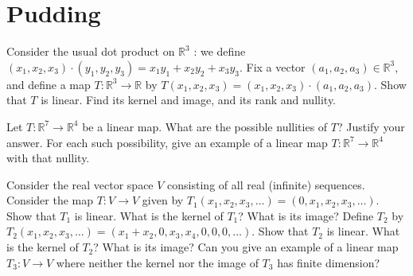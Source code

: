 \documentclass[answers]{exam}
\begin{document}
\section*{Pudding}
\begin{questions}

\question%
Consider the usual dot product on $\mathbb{R}^{3}$ : we define $(x_{1}, x_{2}, x_{3}) \cdot(y_{1}, y_{2}, y_{3})=x_{1} y_{1}+x_{2} y_{2}+x_{3} y_{3}$. Fix a vector $(a_{1}, a_{2}, a_{3}) \in \mathbb{R}^{3}$, and define a map $T: \mathbb{R}^{3} \to \mathbb{R}$ by $T(x_{1}, x_{2}, x_{3})=(x_{1}, x_{2}, x_{3}) \cdot(a_{1}, a_{2}, a_{3})$. Show that $T$ is linear. Find its kernel and image, and its rank and nullity.



\question%
Let $T: \mathbb{R}^{7} \to \mathbb{R}^{4}$ be a linear map. What are the possible nullities of $T$? Justify your answer. For each such possibility, give an example of a linear map $T: \mathbb{R}^{7} \to \mathbb{R}^{4}$ with that nullity.



\question%
Consider the real vector space $V$ consisting of all real (infinite) sequences. Consider the map $T: V \to V$ given by $T_{1}(x_{1}, x_{2}, x_{3}, \ldots)=(0, x_{1}, x_{2}, x_{3}, \ldots)$. Show that $T_{1}$ is linear. What is the kernel of $T_{1}$? What is its image? Define $T_{2}$ by $T_{2}(x_{1}, x_{2}, x_{3}, \ldots)=(x_{1}+x_{2}, 0, x_{3}, x_{4}, 0,0,0, \ldots)$. Show that $T_{2}$ is linear. What is the kernel of $T_{2}$? What is its image? Can you give an example of a linear map $T_{3}: V \to V$ where neither the kernel nor the image of $T_{3}$ has finite dimension?

\end{questions}
\end{document}
